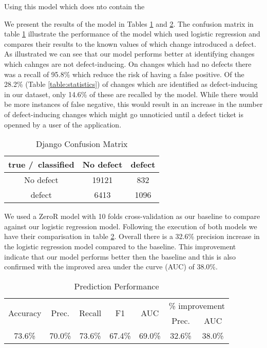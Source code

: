 \documentclass[10pt, conference]{IEEEtran}
\begin{document}
Using this model which does nto contain the 

We present the results of the model in Tables \ref{table:confusion} and \ref{table:prediction}. The confusion matrix in table \ref{table:confusion} illustrate the performance of the model which used logistic regression and compares their results to the known values of which change introduced a defect. As illustrated we can see that our model performs better at identifying changes which cahnges are not defect-inducing. On changes which had no defects there was a recall of 95.8\% which reduce the risk of having a false positive. Of the 28.2\% (Table \ref{table:statistics}) of changes which are identified as defect-inducing in our dataset, only 14.6\% of these are recalled by the model. While there would be more instances of false negative, this would result in an increase in the number of defect-inducing changes which might go unnoticied until a defect ticket is openned by a user of the application.  
\begin{table}[b]
	\centering
	\caption{Django Confusion Matrix}
	\begin{tabular}{|c|c|c|}
		\hline 
		true /\ classified  & No defect  & defect \tabularnewline
		\hline 
		No defect  & 19121  & 832 \tabularnewline
		\hline 
		defect  & 6413  & 1096 \tabularnewline
		\hline 
	\end{tabular}
	\label{table:confusion}
\end{table}

We used a ZeroR model with 10 folds cross-validation as our baseline to compare against our logistic regression model. Following the execution of both models we have their comparisation in table \ref{table:prediction}. Overall there is a 32.6\% precision increase in the logistic regression model compared to the baseline. This improvement indicate that our model performs better then the baseline and this is also confirmed with the improved area under the curve (AUC) of 38.0\%.   

\begin{table}
	\centering
	\caption{Prediction Performance}
	\begin{tabular}{|c|c|c|c|c||c|c|}
		\hline \multirow{2}{*}{Accuracy} & \multirow{2}{*}{Prec.} & \multirow{2}{*}{Recall} & \multirow{2}{*}{F1} & \multirow{2}{*}{AUC} & \multicolumn{2}{|c|}{\% improvement} \\ \cline{6-7} 
		 &  &  &  &  & Prec. & AUC \\  
		\hline 73.6\% & 70.0\% & 73.6\% & 67.4\% & 69.0\% & 32.6\% & 38.0\% \\ 
		\hline 
	\end{tabular}
	
	\label{table:prediction} 
\end{table}
\end{document}

